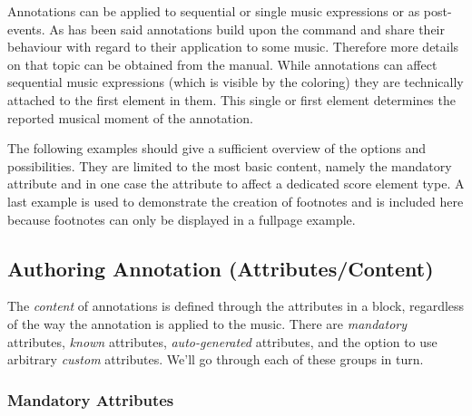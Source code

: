 \documentclass[]{ollmanual}
\newenvironment{Shaded}{}{}
\begin{document}
Annotations can be applied to sequential or single music expressions or
as post-events. As has been said annotations build upon the
 command and share their behaviour with regard to their
application to some music. Therefore more details on that topic can be
obtained from the  manual. While annotations can
affect sequential music expressions (which is visible by the coloring)
they are technically attached to the first element in them. This single
or first element determines the reported musical moment of the
annotation.

The following examples should give a sufficient overview of the options
and possibilities. They are limited to the most basic content, namely
the mandatory  attribute and in one case the
 attribute to affect a dedicated score element type. A last
example is used to demonstrate the creation of footnotes and is included
here because footnotes can only be displayed in a fullpage example.

\begin{Shaded}
\begin{Highlighting}[]

\end{Highlighting}
\end{Shaded}


\hypertarget{authoring-annotation-attributescontent}{%
\subsection{Authoring Annotation
(Attributes/Content)}\label{authoring-annotation-attributescontent}}

The \emph{content} of annotations is defined through the attributes in a
 block, regardless of the way the annotation is applied to the
music. There are \emph{mandatory} attributes, \emph{known} attributes,
\emph{auto-generated} attributes, and the option to use arbitrary
\emph{custom} attributes. We'll go through each of these groups in turn.

\hypertarget{mandatory-attributes}{%
\subsubsection{Mandatory Attributes}\label{mandatory-attributes}}

\end{document}

